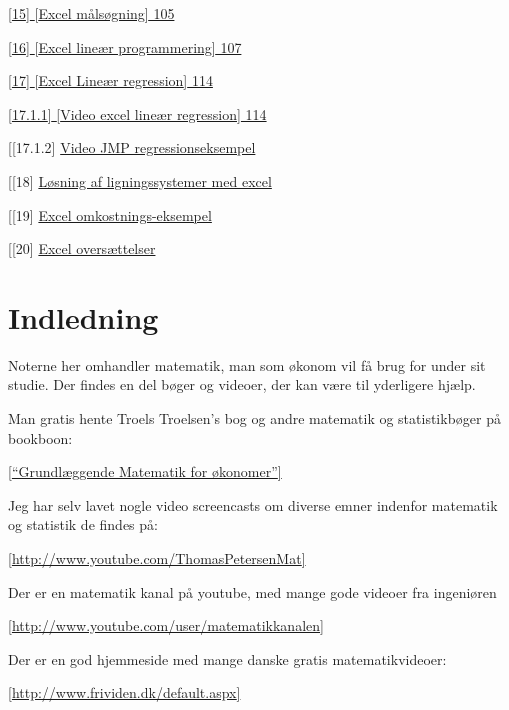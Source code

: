 \documentclass[]{book}
\begin{document}
\protect\hyperlink{excel-muxe5lsuxf8gning}{{[}15{]} {[}Excel
målsøgning{]} 105}

\protect\hyperlink{excel-lineuxe6r-programmering}{{[}16{]} {[}Excel
lineær programmering{]} 107}

\protect\hyperlink{excel-lineuxe6r-regression}{{[}17{]} {[}Excel Lineær
regression{]} 114}

\protect\hyperlink{video-excel-lineuxe6r-regression}{{[}17.1.1{]}
{[}Video excel lineær regression{]} 114}

{[}{[}17.1.2{]} \protect\hyperlink{video-jmp-regressionseksempel}{Video
JMP regressionseksempel}

{[}{[}18{]}
\protect\hyperlink{luxf8sning-af-ligningssystemer-med-excel}{Løsning af
ligningssystemer med excel}

{[}{[}19{]} \protect\hyperlink{excel-omkostnings-eksempel}{Excel
omkostnings-eksempel}

{[}{[}20{]} \protect\hyperlink{excel-oversuxe6ttelser}{Excel
oversættelser}

\hypertarget{indledning}{%
\chapter{Indledning}\label{indledning}}

Noterne her omhandler matematik, man som økonom vil få brug for under
sit studie. Der findes en del bøger og videoer, der kan være til
yderligere hjælp.

Man gratis hente Troels Troelsen's bog og andre matematik og
statistikbøger på bookboon:

\href{http://bookboon.com/dk/grundlaeggende-matematik-for-oekonomer-ebook\#download}{{[}``Grundlæggende
Matematik for økonomer''{]}}

Jeg har selv lavet nogle video screencasts om diverse emner indenfor
matematik og statistik de findes på:

\href{http://www.youtube.com/ThomasPetersenMat}{{[}http://www.youtube.com/ThomasPetersenMat{]}}

Der er en matematik kanal på youtube, med mange gode videoer fra
ingeniøren

\href{http://www.youtube.com/user/matematikkanalen}{{[}http://www.youtube.com/user/matematikkanalen{]}}

Der er en god hjemmeside med mange danske gratis matematikvideoer:

\href{http://www.frividen.dk/default.aspx}{{[}http://www.frividen.dk/default.aspx{]}}
\end{document}

